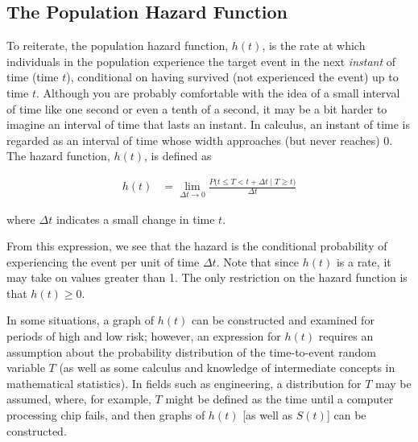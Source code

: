 \documentclass[
]{book}
\begin{document}
\hypertarget{the-population-hazard-function}{%
\subsection*{The Population Hazard Function}\label{the-population-hazard-function}}

To reiterate, the population hazard function, \(h(t)\), is the rate at which individuals in the population experience the target event in the next \emph{instant} of time (time \(t\)), conditional on having survived (not experienced the event) up to time \(t\). Although you are probably comfortable with the idea of a small interval of time like one second or even a tenth of a second, it may be a bit harder to imagine an interval of time that lasts an instant. In calculus, an instant of time is regarded as an interval of time whose width approaches (but never reaches) 0. The hazard function, \(h(t)\), is defined as

\begin{align}\label{9.13}
h(t) &= \lim_{\Delta t \to 0} \frac{P\bigl(t \le T < t + \Delta t \mid T \ge t\bigr)}{\Delta t}
\tag{9.13}
\end{align}

where \(\Delta t\) indicates a small change in time \(t\).

From this expression, we see that the hazard is the conditional probability of experiencing the event per unit of time \(\Delta t\). Note that since \(h(t)\) is a rate, it may take on values greater than 1. The only restriction on the hazard function is that \(h(t) \ge 0\).

In some situations, a graph of \(h(t)\) can be constructed and examined for periods of high and low risk; however, an expression for \(h(t)\) requires an assumption about the probability distribution of the time-to-event random variable \(T\) (as well as some calculus and knowledge of intermediate concepts in mathematical statistics). In fields such as engineering, a distribution for \(T\) may be assumed, where, for example, \(T\) might be defined as the time until a computer processing chip fails, and then graphs of \(h(t)\) {[}as well as \(S(t)\){]} can be constructed.
\end{document}
